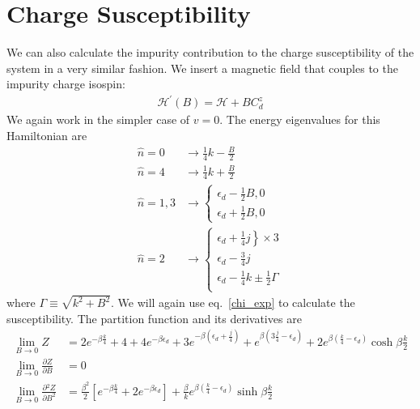\documentclass[twoside]{report}
\numberwithin{equation}{section}
\begin{document}
\section{Charge Susceptibility}
We can also calculate the impurity contribution to the charge susceptibility of the system in a very similar fashion. We insert a magnetic field that couples to the impurity charge isospin:
\begin{equation}\begin{aligned}
	\mathcal{H}^\prime(B) = \mathcal{H} + B C_d^z
\end{aligned}\end{equation}
We again work in the simpler case of \(v=0\). The energy eigenvalues for this Hamiltonian are
\begin{equation}\begin{aligned}
\hat n=0 & \rightarrow\frac{1}{4}k - \frac{B}{2}\\
\hat n=4 &\rightarrow\frac{1}{4}k + \frac{B}{2}\\
\hat n=1,3 &\rightarrow \begin{cases}
	\epsilon_d - \frac{1}{2}B, 0\\ 
	\epsilon_d + \frac{1}{2}B, 0
	\end{cases}\\
	\hat n=2 &\rightarrow \begin{cases}
	\left.\epsilon_d + \frac{1}{4}j \right\}\times 3\\
	\epsilon_d - \frac{3}{4}j \\
	\epsilon_d -\frac{1}{4}k \pm \frac{1}{2} \Gamma \\
\end{cases}
\end{aligned}\end{equation}
where \(\Gamma \equiv \sqrt{k^2 + B^2}\). We will again use eq.~\ref{chi_exp} to calculate the susceptibility. The partition function and its derivatives are
\begin{equation}\begin{aligned}
	\lim_{B \to 0} Z &= 2e^{-\beta \frac{k}{4}} + 4 + 4e^{-\beta \epsilon_d} + 3e^{-\beta\left( \epsilon_d + \frac{j}{4} \right) } + e^{\beta\left( 3\frac{j}{4} - \epsilon_d \right)} + 2e^{\beta \left(\frac{k}{4} - \epsilon_d\right)}\cosh \beta \frac{k}{2}\\
	\lim_{B \to 0} \frac{\partial{Z}}{\partial{B}} &= 0 \\
	\lim_{B \to 0} \frac{\partial{^2Z}}{\partial{B^2}} &= \frac{\beta^2}{2}\left[e^{-\beta \frac{k}{4}} + 2e^{-\beta \epsilon_d}\right] + \frac{\beta}{k}e^{\beta\left(\frac{k}{4} - \epsilon_d\right)}\sinh \beta\frac{k}{2}
\end{aligned}\end{equation}
\end{document}
